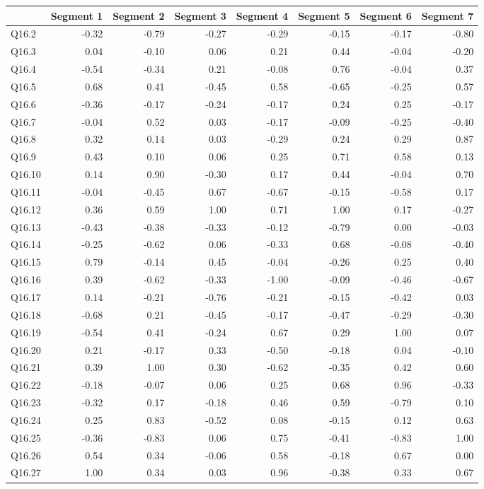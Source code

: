 \documentclass[
]{article}
\begin{document}
\begin{center}
\begin{longtable}{lrrrrrrr}
\toprule
  & Segment 1 & Segment 2 & Segment 3 & Segment 4 & Segment 5 & Segment 6 & Segment 7\\
\midrule
Q16.2 & -0.32 & -0.79 & -0.27 & -0.29 & -0.15 & -0.17 & -0.80\\
Q16.3 & 0.04 & -0.10 & 0.06 & 0.21 & 0.44 & -0.04 & -0.20\\
Q16.4 & -0.54 & -0.34 & 0.21 & -0.08 & 0.76 & -0.04 & 0.37\\
Q16.5 & 0.68 & 0.41 & -0.45 & 0.58 & -0.65 & -0.25 & 0.57\\
Q16.6 & -0.36 & -0.17 & -0.24 & -0.17 & 0.24 & 0.25 & -0.17\\
\addlinespace
Q16.7 & -0.04 & 0.52 & 0.03 & -0.17 & -0.09 & -0.25 & -0.40\\
Q16.8 & 0.32 & 0.14 & 0.03 & -0.29 & 0.24 & 0.29 & 0.87\\
Q16.9 & 0.43 & 0.10 & 0.06 & 0.25 & 0.71 & 0.58 & 0.13\\
Q16.10 & 0.14 & 0.90 & -0.30 & 0.17 & 0.44 & -0.04 & 0.70\\
Q16.11 & -0.04 & -0.45 & 0.67 & -0.67 & -0.15 & -0.58 & 0.17\\
\addlinespace
Q16.12 & 0.36 & 0.59 & 1.00 & 0.71 & 1.00 & 0.17 & -0.27\\
Q16.13 & -0.43 & -0.38 & -0.33 & -0.12 & -0.79 & 0.00 & -0.03\\
Q16.14 & -0.25 & -0.62 & 0.06 & -0.33 & 0.68 & -0.08 & -0.40\\
Q16.15 & 0.79 & -0.14 & 0.45 & -0.04 & -0.26 & 0.25 & 0.40\\
Q16.16 & 0.39 & -0.62 & -0.33 & -1.00 & -0.09 & -0.46 & -0.67\\
\addlinespace
Q16.17 & 0.14 & -0.21 & -0.76 & -0.21 & -0.15 & -0.42 & 0.03\\
Q16.18 & -0.68 & 0.21 & -0.45 & -0.17 & -0.47 & -0.29 & -0.30\\
Q16.19 & -0.54 & 0.41 & -0.24 & 0.67 & 0.29 & 1.00 & 0.07\\
Q16.20 & 0.21 & -0.17 & 0.33 & -0.50 & -0.18 & 0.04 & -0.10\\
Q16.21 & 0.39 & 1.00 & 0.30 & -0.62 & -0.35 & 0.42 & 0.60\\
\addlinespace
Q16.22 & -0.18 & -0.07 & 0.06 & 0.25 & 0.68 & 0.96 & -0.33\\
Q16.23 & -0.32 & 0.17 & -0.18 & 0.46 & 0.59 & -0.79 & 0.10\\
Q16.24 & 0.25 & 0.83 & -0.52 & 0.08 & -0.15 & 0.12 & 0.63\\
Q16.25 & -0.36 & -0.83 & 0.06 & 0.75 & -0.41 & -0.83 & 1.00\\
Q16.26 & 0.54 & 0.34 & -0.06 & 0.58 & -0.18 & 0.67 & 0.00\\
\addlinespace
Q16.27 & 1.00 & 0.34 & 0.03 & 0.96 & -0.38 & 0.33 & 0.67\\
\bottomrule
\end{longtable}\end{center}
\end{document}
